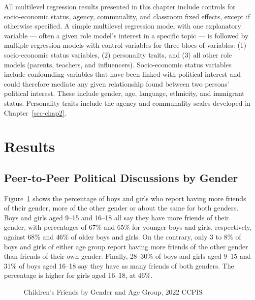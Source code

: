 \documentclass[
  letterpaper,
  DIV=11,
  numbers=noendperiod]{scrreprt}
\begin{document}
All multilevel regression results presented in this chapter include
controls for socio-economic status, agency, communality, and classroom
fixed effects, except if otherwise specified. A simple multilevel
regression model with one explanatory variable --- often a given role
model's interest in a specific topic --- is followed by multiple
regression models with control variables for three blocs of variables:
(1) socio-economic status variables, (2) personality traits, and (3) all
other role models (parents, teachers, and influencers). Socio-economic
status variables include confounding variables that have been linked
with political interest and could therefore mediate any given
relationship found between two persons' political interest. These
include gender, age, language, ethnicity, and immigrant status.
Personality traits include the agency and communality scales developed
in Chapter~\ref{sec-chap2}.

\section{Results}\label{results-2}

\subsection{Peer-to-Peer Political Discussions by
Gender}\label{peer-to-peer-political-discussions-by-gender}

Figure~\ref{fig-peers-genderage} shows the percentage of boys and girls
who report having more friends of their gender, more of the other gender
or about the same for both genders. Boys and girls aged 9--15 and 16--18
all say they have more friends of their gender, with percentages of 67\%
and 65\% for younger boys and girls, respectively, against 68\% and 46\%
of older boys and girls. On the contrary, only 3 to 8\% of boys and
girls of either age group report having more friends of the other gender
than friends of their own gender. Finally, 28--30\% of boys and girls
aged 9--15 and 31\% of boys aged 16--18 say they have as many friends of
both genders. The percentage is higher for girls aged 16--18, at 46\%.

\begin{figure}


\caption{\label{fig-peers-genderage}Children's Friends by Gender and Age
Group, 2022 CCPIS}

\end{figure}%
\end{document}
